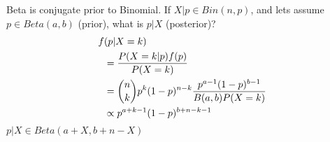 \begin{slide}%
Beta is conjugate prior to Binomial. If $X|p \in Bin(n,p)$, and lets assume $p \in Beta(a,b)$ (prior), what is $p|X$ (posterior)? 
\begin{align*}
f&(p| X=k) 
\\
&= {P(X=k|p)f(p) \over P(X=k)} 
\\
&= { n\choose k} p^k(1-p)^{n-k} {p^{a-1}(1-p)^{b-1} \over B(a,b) P(X=k)} 
\\
&\propto p^{a+k-1}(1-p)^{b+n-k-1}
\end{align*}
$p|X \in Beta (a+X,b+n-X)$
\end{slide}%
